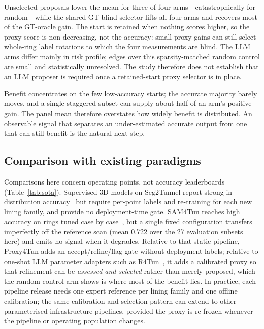 \documentclass[a4paper,fleqn]{cas-dc}
\begin{document}
Unselected proposals lower the mean for three of four arms---catastrophically for random---while the shared GT-blind selector lifts all four arms and recovers most of the GT-oracle gain. The start is retained when nothing scores higher, so the proxy score is non-decreasing, not the accuracy: small proxy gains can still select whole-ring label rotations to which the four measurements are blind. The LLM arms differ mainly in risk profile; edges over this sparsity-matched random control are small and statistically unresolved. The study therefore does not establish that an LLM proposer is required once a retained-start proxy selector is in place.

Benefit concentrates on the few low-accuracy starts; the accurate majority barely moves, and a single staggered subset can supply about half of an arm's positive gain. The panel mean therefore overstates how widely benefit is distributed. An observable signal that separates an under-estimated accurate output from one that can still benefit is the natural next step.

\subsection{Comparison with existing paradigms}\label{sec:positioning}

Comparisons here concern operating points, not accuracy leaderboards (Table~\ref{tab:sota}). Supervised 3D models on Seg2Tunnel report strong in-distribution accuracy~\cite{lin2024seg2tunnel} but require per-point labels and re-training for each new lining family, and provide no deployment-time gate. SAM4Tun reaches high accuracy on rings tuned case by case~\cite{ye2025sam4tun}, but a single fixed configuration transfers imperfectly off the reference scan (mean 0.722 over the 27 evaluation subsets here) and emits no signal when it degrades. Relative to that static pipeline, Proxy4Tun adds an accept/refine/flag gate without deployment labels; relative to one-shot LLM parameter adapters such as R4Tun~\cite{taoR4Tun}, it adds a calibrated proxy so that refinement can be \emph{assessed and selected} rather than merely proposed, which the random-control arm shows is where most of the benefit lies. In practice, each pipeline release needs one expert reference per lining family and one offline calibration; the same calibration-and-selection pattern can extend to other parameterised infrastructure pipelines, provided the proxy is re-frozen whenever the pipeline or operating population changes.
\end{document}
